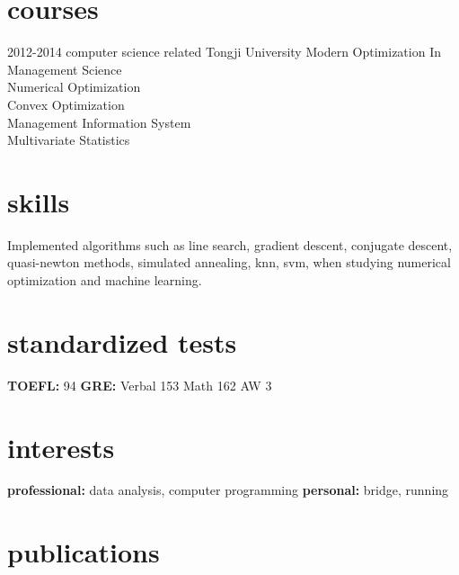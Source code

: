 \documentclass[]{friggeri-cv} %
\begin{document}
\section{courses}
\begin{entrylist}
\entry
{2012-2014}
{computer science related}
{Tongji University}
{Modern Optimization In Management Science\\
Numerical Optimization\\
Convex Optimization\\
Management Information System\\
Multivariate Statistics}
\end{entrylist}





\section{skills}
{Implemented algorithms such as line search, gradient descent, conjugate descent, quasi-newton methods, simulated annealing, knn, svm, when studying numerical optimization and machine learning.}

\section{standardized tests}
\textbf{TOEFL:} 94  \textbf{GRE:} Verbal 153 Math 162 AW 3



\section{interests}

\textbf{professional:} data analysis, computer programming  \textbf{personal:} bridge, running


\section{publications}
\end{document}
